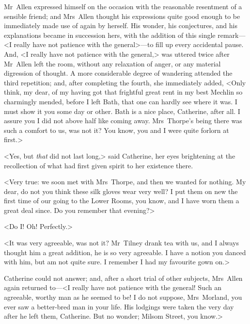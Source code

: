  Mr~Allen expressed himself on the occasion with the reasonable resentment of a sensible friend; and Mrs~Allen thought his expressions quite good enough to be immediately made use of again by herself. His wonder, his conjectures, and his explanations became in succession hers, with the addition of this single remark—<I really have not patience with the general>—to fill up every accidental pause. And, <I really have not patience with the general,> was uttered twice after Mr~Allen left the room, without any relaxation of anger, or any material digression of thought. A more considerable degree of wandering attended the third repetition; and, after completing the fourth, she immediately added, <Only think, my dear, of my having got that frightful great rent in my best Mechlin so charmingly mended, before I left Bath, that one can hardly see where it was. I must show it you some day or other. Bath is a nice place, Catherine, after all. I assure you I did not above half like coming away. Mrs~Thorpe's being there was such a comfort to us, was not it? You know, you and I were quite forlorn at first.> 

 <Yes, but \textit{that} did not last long,> said Catherine, her eyes brightening at the recollection of what had first given spirit to her existence there. 

 <Very true: we soon met with Mrs~Thorpe, and then we wanted for nothing. My dear, do not you think these silk gloves wear very well? I put them on new the first time of our going to the Lower Rooms, you know, and I have worn them a great deal since. Do you remember that evening?> 

 <Do I! Oh! Perfectly.> 

 <It was very agreeable, was not it? Mr~Tilney drank tea with us, and I always thought him a great addition, he is so very agreeable. I have a notion you danced with him, but am not quite sure. I remember I had my favourite gown on.> 

 Catherine could not answer; and, after a short trial of other subjects, Mrs~Allen again returned to—<I really have not patience with the general! Such an agreeable, worthy man as he seemed to be! I do not suppose, Mrs~Morland, you ever saw a better-bred man in your life. His lodgings were taken the very day after he left them, Catherine. But no wonder; Milsom Street, you know.> 

